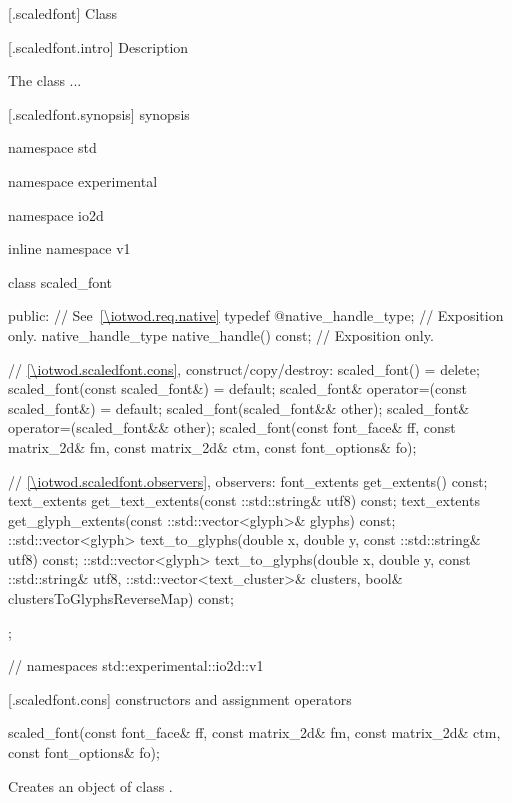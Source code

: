  [\iotwod.scaledfont] {Class }

 [\iotwod.scaledfont.intro] { Description}

\pnum
{}%
The  class ...

 [\iotwod.scaledfont.synopsis] { synopsis}

\begin{codeblock}
namespace std { namespace experimental { namespace io2d { inline namespace v1 {
  class scaled_font {
  public:
    // See~\ref{\iotwod.req.native}
    typedef @\impdef@ native_handle_type; // Exposition only.
    native_handle_type native_handle() const; // Exposition only.

    // \ref{\iotwod.scaledfont.cons}, construct/copy/destroy:
    scaled_font() = delete;
    scaled_font(const scaled_font&) = default;
    scaled_font& operator=(const scaled_font&) = default;
    scaled_font(scaled_font&& other);
    scaled_font& operator=(scaled_font&& other);
    scaled_font(const font_face& ff, const matrix_2d& fm, const matrix_2d& ctm, 
    const font_options& fo);

    // \ref{\iotwod.scaledfont.observers}, observers:
    font_extents get_extents() const;
    text_extents get_text_extents(const ::std::string& utf8) const;
    text_extents get_glyph_extents(const ::std::vector<glyph>& glyphs) const;
    ::std::vector<glyph> text_to_glyphs(double x, double y, const 
      ::std::string& utf8) const;
    ::std::vector<glyph> text_to_glyphs(double x, double y, const 
      ::std::string& utf8, ::std::vector<text_cluster>& clusters, bool& 
      clustersToGlyphsReverseMap) const;
  };
} } } } // namespaces std::experimental::io2d::v1
\end{codeblock}

 [\iotwod.scaledfont.cons] { constructors and 
assignment operators}

%
\begin{itemdecl}
scaled_font(const font_face& ff, const matrix_2d& fm, const matrix_2d& ctm, 
    const font_options& fo);
\end{itemdecl}
\begin{itemdescr}
	\pnum
	\effects
	Creates an object of class .
	
	\pnum
	\postconditions
	
\end{itemdescr}

